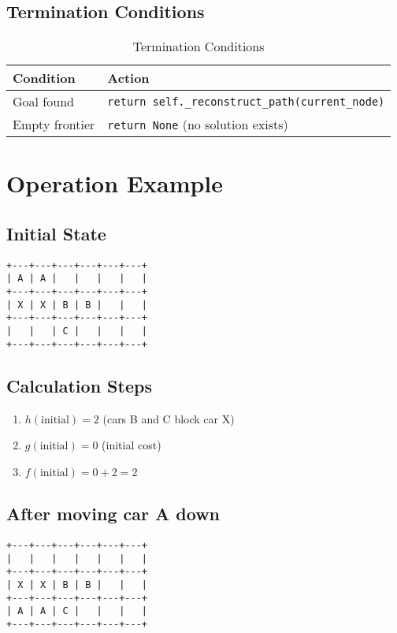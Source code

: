 \documentclass[12pt,a4paper]{article}
\begin{document}
\subsection{Termination Conditions}

\begin{table}[h!]
\centering
\begin{tabular}{|l|l|}
\hline
\textbf{Condition} & \textbf{Action} \\
\hline
Goal found & \texttt{return self.\_reconstruct\_path(current\_node)} \\
\hline
Empty frontier & \texttt{return None} (no solution exists) \\
\hline
\end{tabular}
\caption{Termination Conditions}
\end{table}

\section{Operation Example}

\subsection{Initial State}
\begin{verbatim}
+---+---+---+---+---+---+
| A | A |   |   |   |   |
+---+---+---+---+---+---+
| X | X | B | B |   |   |
+---+---+---+---+---+---+
|   |   | C |   |   |   |
+---+---+---+---+---+---+
\end{verbatim}

\subsection{Calculation Steps}
\begin{enumerate}
    \item $h(\text{initial}) = 2$ (cars B and C block car X)
    \item $g(\text{initial}) = 0$ (initial cost)
    \item $f(\text{initial}) = 0 + 2 = 2$
\end{enumerate}

\subsection{After moving car A down}
\begin{verbatim}
+---+---+---+---+---+---+
|   |   |   |   |   |   |
+---+---+---+---+---+---+
| X | X | B | B |   |   |
+---+---+---+---+---+---+
| A | A | C |   |   |   |
+---+---+---+---+---+---+
\end{verbatim}
\end{document}
